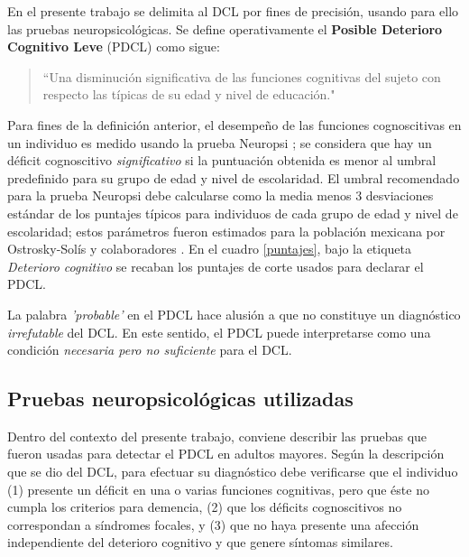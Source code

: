 En el presente trabajo se delimita al DCL por fines de precisión, usando para ello las pruebas neuropsicológicas. 
%
Se define operativamente el \textbf{Posible Deterioro Cognitivo Leve} (PDCL) como sigue:
\begin{quote}
``Una disminución significativa de las funciones cognitivas del sujeto con respecto las típicas de su edad y nivel de educación."
\end{quote}

Para fines de la definición anterior, el desempeño de las funciones cognoscitivas en un individuo es medido usando la prueba Neuropsi \cite{Ostrosky1999}; se considera que hay un déficit cognoscitivo \textit{significativo} si la puntuación obtenida es menor al umbral predefinido para su grupo de edad y nivel de escolaridad.
%
El umbral recomendado para la prueba Neuropsi debe calcularse como la media menos 3 desviaciones estándar de los puntajes típicos para individuos de cada grupo de edad y nivel de escolaridad; estos parámetros fueron estimados para la población mexicana por Ostrosky-Solís y colaboradores \cite{Ostrosky1999}.
%
En el cuadro \ref{puntajes}, bajo la etiqueta \textit{Deterioro cognitivo} se recaban los puntajes de corte usados para declarar el PDCL.

La palabra \textit{'probable'} en el PDCL hace alusión a que no constituye un diagnóstico \textit{irrefutable} del DCL.
%
%
En este sentido, el PDCL puede interpretarse como una condición \textit{necesaria pero no suficiente} para el DCL.


\subsection{Pruebas neuropsicológicas utilizadas}
\label{seccion:pruebas}

Dentro del contexto del presente trabajo, conviene describir las pruebas que fueron usadas para detectar el PDCL en adultos mayores.
%
Según la descripción que se dio del DCL, para efectuar su diagnóstico debe verificarse que el individuo (1) presente un déficit en una o varias funciones cognitivas, pero que éste no cumpla los criterios para demencia, (2) que los déficits cognoscitivos no correspondan a síndromes focales, y (3) que no haya presente una afección independiente del deterioro cognitivo y que genere síntomas similares.

